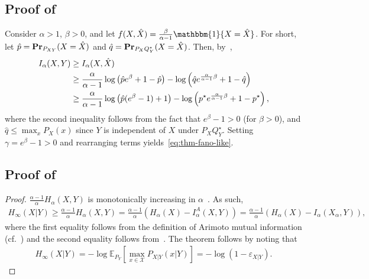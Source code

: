 \documentclass{article}
\numberwithin{theorem}{section}
\numberwithin{example}{section}
\numberwithin{remark}{section}
\numberwithin{definition}{section}
\newcommand{\E}{\mathbb{E}}
\def\Pr{{\rm \mathbf {Pr}}}
\newcommand{\X}{\mathcal{X}}
\newcommand{\eps}{\varepsilon}
\begin{document}
\subsection{Proof of~} \label{app:fano-like}

Consider $\alpha >1$, $\beta > 0$, and let $f(X,\hat{X}) = \frac{\beta}{\alpha-1}\mathbbm{1} \{X = \hat{X}\}$. For short, let $\hat{p} = \Pr_{P_{XY}}( X =\hat{X})$ and $\hat{q} =  \Pr_{P_{X}Q^\star_{Y}}( X =\hat{X})$. Then, by~,
\begin{align}
    I_\alpha(X,Y) 
    & \geq I_\alpha(X,\hat{X}) \notag \\
    & \geq \frac{\alpha}{\alpha-1} \log \left( \hat{p} e^\beta + 1- \hat{p} \right) - \log \left( \hat{q} e^{ \frac{\alpha}{\alpha-1}\beta} + 1- \hat{q} \right) \notag \\
    & \geq  \frac{\alpha}{\alpha-1} \log \left( \hat{p} (e^\beta-1) + 1 \right)- \log \left( p^\star e^{ \frac{\alpha}{\alpha-1}\beta} + 1- p^\star \right), 
\end{align}
where the second inequality follows from the fact that $e^\beta -1 > 0$ (for $\beta >0$), and $\hat{q} \leq \max_x P_X(x)$ since $Y$ is independent of $X$ under $P_X Q^\star_Y$. Setting $\gamma = e^\beta -1 >0$ and rearranging terms yields~\cref{eq:thm-fano-like}. 
    

\subsection{Proof of~} \label{app:fano-Arimoto}
\begin{proof}
      $\frac{\alpha-1}{\alpha} H_\alpha(X,Y)$ is monotonically increasing in $\alpha$~\cite[Proposition 2]{SasonV:17}. As such,
    \begin{align}
        H_\infty(X|Y) \geq \frac{\alpha-1}{\alpha} H_\alpha(X,Y) = \frac{\alpha-1}{\alpha} (H_\alpha(X) - I_\alpha^A(X,Y)) =  \frac{\alpha-1}{\alpha} (H_\alpha(X) - I_\alpha(X_\alpha,Y)), 
    \end{align}
    where the first equality follows from the definition of Arimoto mutual information (cf.~) and the second equality follows from~. The theorem follows by noting that
    \begin{align}
        H_\infty (X|Y) =  - \log \E_{P_Y} \left[  \max_{x \in \X} P_{X|Y}(x|Y) \right] = - \log \left( 1- \eps_{X|Y} \right).
    \end{align}
\end{proof}
\end{document}
